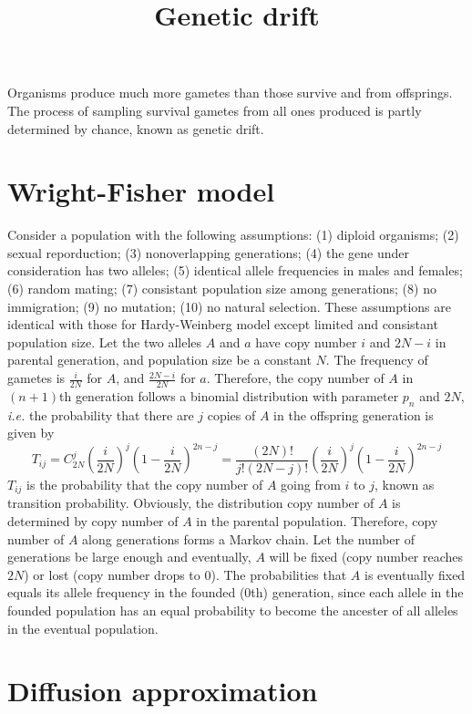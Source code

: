 \documentclass[11pt]{article}
\title{Genetic drift}
\author{}
\date{}
\begin{document}
\begin{sloppypar}
  \maketitle

  \linenumbers
Organisms produce much more gametes than those survive and from offsprings. 
The process of sampling survival gametes from all ones produced is partly determined by chance, known as genetic drift. 

\section{Wright-Fisher model}
Consider a population with the following assumptions: 
(1) diploid organisms; (2) sexual reporduction; (3) nonoverlapping generations; (4) the gene under consideration has two alleles; (5) identical allele frequencies in males and females; (6) random mating; (7) consistant population size among generations; (8) no immigration; (9) no mutation; (10) no natural selection. 
These assumptions are identical with those for Hardy-Weinberg model except limited and consistant population size. 
Let the two alleles $A$ and $a$ have copy number $i$ and $2N-i$ in parental generation, and population size be a constant $N$. 
The frequency of gametes is $\frac{i}{2N}$ for $A$, and $\frac{2N-i}{2N}$ for $a$. 
Therefore, the copy number of $A$ in $(n+1)$th generation follows a binomial distribution with parameter $p_n$ and $2N$, \textit{i.e.} the probability that there are $j$ copies of $A$ in the offspring generation is given by
\begin{equation}
  T_{ij} = C_{2N}^j (\frac{i}{2N})^j (1-\frac{i}{2N})^{2n-j} = \frac{(2N)!}{j!(2N-j)!} (\frac{i}{2N})^j (1-\frac{i}{2N})^{2n-j}
\end{equation}
$T_{ij}$ is the probability that the copy number of $A$ going from $i$ to $j$, known as transition probability. 
Obviously, the distribution copy number of $A$ is determined by copy number of $A$ in the parental population. 
Therefore, copy number of $A$ along generations forms a Markov chain. 
Let the number of generations be large enough and eventually, $A$ will be fixed (copy number reaches $2N$) or lost (copy number drops to 0). 
The probabilities that $A$ is eventually fixed equals its allele frequency in the founded (0th) generation, since each allele in the founded population has an equal probability to become the ancester of all alleles in the eventual population. 

\section{Diffusion approximation}



\end{sloppypar}
\end{document}
